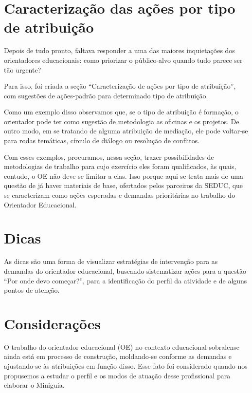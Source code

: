 \documentclass[
  letterpaper,
  DIV=11,
  numbers=noendperiod,
  oneside]{scrreprt}
\begin{document}
\hypertarget{caracterizauxe7uxe3o-das-auxe7uxf5es-por-tipo-de-atribuiuxe7uxe3o}{%
\section{Caracterização das ações por tipo de
atribuição}\label{caracterizauxe7uxe3o-das-auxe7uxf5es-por-tipo-de-atribuiuxe7uxe3o}}

Depois de tudo pronto, faltava responder a uma das maiores inquietações
dos orientadores educacionais: como priorizar o público-alvo quando tudo
parece ser tão urgente?

Para isso, foi criada a seção ``Caracterização de ações por tipo de
atribuição'', com sugestões de ações-padrão para determinado tipo de
atribuição.

Como um exemplo disso observamos que, se o tipo de atribuição é
formação, o orientador pode ter como sugestão de metodologia as oficinas
e os projetos. De outro modo, em se tratando de alguma atribuição de
mediação, ele pode voltar-se para rodas temáticas, círculo de diálogo ou
resolução de conflitos.

Com esses exemplos, procuramos, nessa seção, trazer possibilidades de
metodologias de trabalho para cujo exercício eles foram qualificados, às
quais, contudo, o OE não deve se limitar a elas. Isso porque aqui se
trata mais de uma questão de já haver materiais de base, ofertados pelos
parceiros da SEDUC, que se caracterizam como ações esperadas e demandas
prioritárias no trabalho do Orientador Educacional.

\hypertarget{dicas}{%
\section{Dicas}\label{dicas}}

As dicas são uma forma de visualizar estratégias de intervenção para as
demandas do orientador educacional, buscando sistematizar ações para a
questão ``Por onde devo começar?'', para a identificação do perfil da
atividade e de alguns pontos de atenção.

\hypertarget{considerauxe7uxf5es}{%
\section{Considerações}\label{considerauxe7uxf5es}}

O trabalho do orientador educacional (OE) no contexto educacional
sobralense ainda está em processo de construção, moldando-se conforme as
demandas e ajustando-se às atribuições em função disso. Esse fato foi
considerado quando nos propusemos a estudar o perfil e os modos de
atuação desse profissional para elaborar o Miniguia.
\end{document}
